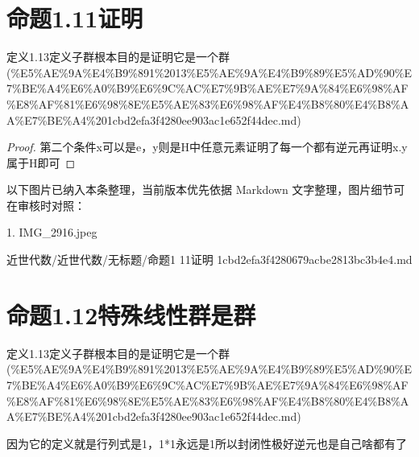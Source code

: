\section*{命题1.11证明}

\begin{note}[来源上级主题]

定义1.13定义子群根本目的是证明它是一个群 (\%E5\%AE\%9A\%E4\%B9\%891\%2013\%E5\%AE\%9A\%E4\%B9\%89\%E5\%AD\%90\%E7\%BE\%A4\%E6\%A0\%B9\%E6\%9C\%AC\%E7\%9B\%AE\%E7\%9A\%84\%E6\%98\%AF\%E8\%AF\%81\%E6\%98\%8E\%E5\%AE\%83\%E6\%98\%AF\%E4\%B8\%80\%E4\%B8\%AA\%E7\%BE\%A4\%201cbd2efa3f4280ee903ac1e652f44dec.md)

\end{note}

\begin{proof}

第二个条件x可以是e，y则是H中任意元素证明了每一个都有逆元再证明x.y属于H即可

\end{proof}

\begin{note}[关联图片]
以下图片已纳入本条整理，当前版本优先依据 Markdown 文字整理，图片细节可在审核时对照：

1. IMG\_2916.jpeg\\

\end{note}

\begin{note}[来源路径]

近世代数/近世代数/无标题/命题1 11证明 1cbd2efa3f4280679acbe2813bc3b4e4.md

\end{note}

\section*{命题1.12特殊线性群是群}

\begin{note}[来源上级主题]

定义1.13定义子群根本目的是证明它是一个群 (\%E5\%AE\%9A\%E4\%B9\%891\%2013\%E5\%AE\%9A\%E4\%B9\%89\%E5\%AD\%90\%E7\%BE\%A4\%E6\%A0\%B9\%E6\%9C\%AC\%E7\%9B\%AE\%E7\%9A\%84\%E6\%98\%AF\%E8\%AF\%81\%E6\%98\%8E\%E5\%AE\%83\%E6\%98\%AF\%E4\%B8\%80\%E4\%B8\%AA\%E7\%BE\%A4\%201cbd2efa3f4280ee903ac1e652f44dec.md)

\end{note}

\begin{proposition}[命题1.12特殊线性群是群]

因为它的定义就是行列式是1，1*1永远是1所以封闭性极好逆元也是自己啥都有了

\end{proposition}

